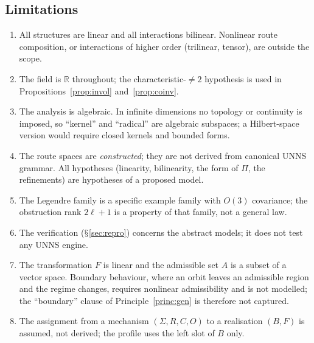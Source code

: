 \documentclass[11pt,a4paper]{article}
\renewcommand{\S}{\ensuremath{\mathsection}}
\newcommand{\RR}{\mathbb{R}}
\theoremstyle{plain}
\theoremstyle{definition}
\begin{document}
\subsection{Limitations}\label{sec:limits}
\begin{enumerate}[label=(L\arabic*)]
\item All structures are linear and all interactions bilinear. Nonlinear route composition, or interactions of higher order (trilinear, tensor), are outside the scope.
\item The field is $\RR$ throughout; the characteristic-$\neq2$ hypothesis is used in Propositions~\ref{prop:invol} and~\ref{prop:coinv}.
\item The analysis is algebraic. In infinite dimensions no topology or continuity is imposed, so ``kernel'' and ``radical'' are algebraic subspaces; a Hilbert-space version would require closed kernels and bounded forms.
\item The route spaces are \emph{constructed}; they are not derived from canonical UNNS grammar. All hypotheses (linearity, bilinearity, the form of $\Pi$, the refinements) are hypotheses of a proposed model.
\item The Legendre family is a specific example family with $O(3)$ covariance; the obstruction rank $2\ell+1$ is a property of that family, not a general law.
\item The verification (\S\ref{sec:repro}) concerns the abstract models; it does not test any UNNS engine.
\item The transformation $F$ is linear and the admissible set $A$ is a subset of a vector space. Boundary behaviour, where an orbit leaves an admissible region and the regime changes, requires nonlinear admissibility and is not modelled; the ``boundary'' clause of Principle~\ref{princ:gen} is therefore not captured.
\item The assignment from a mechanism $(\Sigma,R,C,O)$ to a realisation $(B,F)$ is assumed, not derived; the profile uses the left slot of $B$ only.
\end{enumerate}
\end{document}
